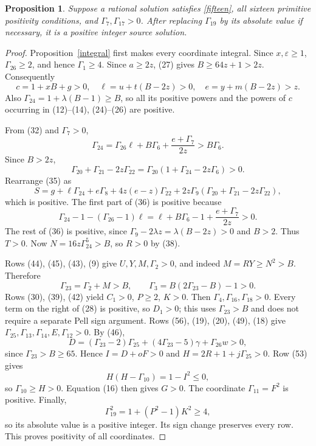 \documentclass[11pt]{article}
\newtheorem{proposition}[theorem]{Proposition}
\begin{document}
\begin{proposition}\label{positive}
Suppose a rational solution satisfies \eqref{fifteen}, all sixteen
primitive positivity conditions, and
\(\Gamma_7,\Gamma_{17}>0\). After replacing \(\Gamma_{19}\) by its
absolute value if necessary, it is a positive integer source solution.
\end{proposition}
\begin{proof}
Proposition~\ref{integral} first makes every coordinate integral.
Since \(x,\varepsilon\ge1\), \(\Gamma_{26}\ge2\), and hence
\(\Gamma_1\ge4\). Since \(a\ge2z\), (27) gives
\(B\ge64z+1>2z\). Consequently
\[
c=1+xB+g>0,\quad
\ell=u+t(B-2z)>0,\quad e=y+m(B-2z)>z.
\]
Also
\(\Gamma_{24}=1+\lambda(B-1)\ge B\), so all its positive powers
and the powers of \(c\) occurring in (12)--(14), (24)--(26) are positive.

From (32) and \(\Gamma_7>0\),
\begin{equation}\label{slackidentity}
\Gamma_{24}=\Gamma_{26}\ell+B\Gamma_6+
                 \frac{e+\Gamma_7}{2z}>B\Gamma_6.
\end{equation}
Since \(B>2z\),
\[
\Gamma_{20}+\Gamma_{21}-2z\Gamma_{22}
 =\Gamma_{20}(1+\Gamma_{24}-2z\Gamma_6)>0.
\]
Rearrange (35) as
\[
S=g+\ell\Gamma_{24}+e\Gamma_8+4z(e-z)\Gamma_{22}
 +2z\Gamma_9(\Gamma_{20}+\Gamma_{21}-2z\Gamma_{22}),
\]
which is positive. The first part of (36) is positive because
\[
\Gamma_{24}-1-(\Gamma_{26}-1)\ell
 =\ell+B\Gamma_6-1+\frac{e+\Gamma_7}{2z}>0.
\]
The rest of (36) is positive, since
\(\Gamma_9-2\lambda z=\lambda(B-2z)>0\) and \(B>2\).
Thus \(T>0\). Now \(N=16z\Gamma_{24}^5>B\), so \(R>0\) by (38).

Rows (44), (45), (43), (9) give \(U,Y,M,\Gamma_2>0\), and indeed
\(M=RY\ge N^2>B\). Therefore
\[
\Gamma_{23}=\Gamma_2+M>B,
\qquad \Gamma_3=B(2\Gamma_{23}-B)-1>0.
\]
Rows (30), (39), (42) yield \(C_1>0\), \(P\ge2\), \(K>0\).
Then \(\Gamma_4,\Gamma_{16},\Gamma_{18}>0\). Every term on the
right of (28) is positive, so \(D_1>0\); this uses
\(\Gamma_{23}>B\) and does not require a separate Pell sign argument.
Rows (56), (19), (20), (49), (18) give
\(\Gamma_{25},\Gamma_{13},\Gamma_{14},E,\Gamma_{12}>0\).
By (46),
\[
D=(\Gamma_{23}-2)\Gamma_{25}+(4\Gamma_{23}-5)\gamma
      +\Gamma_{26}w>0,
\]
since \(\Gamma_{23}>B\ge65\). Hence \(I=D+oF>0\) and
\(H=2R+1+j\Gamma_{25}>0\). Row (53) gives
\[
H(H-\Gamma_{10})=1-I^2\le0,
\]
so \(\Gamma_{10}\ge H>0\). Equation (16) then gives \(G>0\).
The coordinate \(\Gamma_{11}=F^2\) is positive. Finally,
\[
\Gamma_{19}^2=1+(P^2-1)K^2\ge4,
\]
so its absolute value is a positive integer. Its sign change preserves
every row. This proves positivity of all coordinates.
\end{proof}
\end{document}
